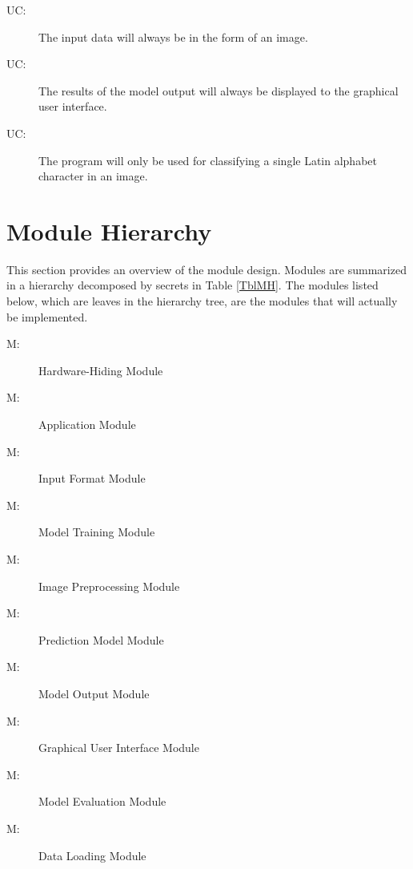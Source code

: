 \documentclass[12pt, titlepage]{article}
\newcounter{ucnum}
\newcommand{\uctheucnum}{UC\theucnum}
\newcounter{mnum}
\newcommand{\mthemnum}{M\themnum}
\begin{document}
\begin{description}
\item[ \uctheucnum \label{ucInput}:] The input data will
always be in the form of an image.
\item[ \uctheucnum \label{ucOutput}:] The results of the
model output will always be displayed to the graphical user interface.
\item[ \uctheucnum \label{ucPurpose}:] The program will
only be used for classifying a single Latin alphabet character in an image.
\end{description}

\section{Module Hierarchy} \label{SecMH}

This section provides an overview of the module design. Modules are summarized
in a hierarchy decomposed by secrets in Table \ref{TblMH}. The modules listed
below, which are leaves in the hierarchy tree, are the modules that will
actually be implemented.

\begin{description}
\item [ \mthemnum \label{mHH}:] Hardware-Hiding Module
\item [ \mthemnum \label{mApplication}:] Application Module
\item [ \mthemnum \label{mInput}:] Input Format Module
\item [ \mthemnum \label{mTraining}:] Model Training Module
\item [ \mthemnum \label{mPreprocessing}:] Image Preprocessing Module
\item [ \mthemnum \label{mModel}:] Prediction Model Module
\item [ \mthemnum \label{mOutput}:] Model Output Module
\item [ \mthemnum \label{mGUI}:] Graphical User Interface Module
\item [ \mthemnum \label{mAccuracy}:] Model Evaluation Module
\item [ \mthemnum \label{mData}:] Data Loading Module
\end{description}
\end{document}
